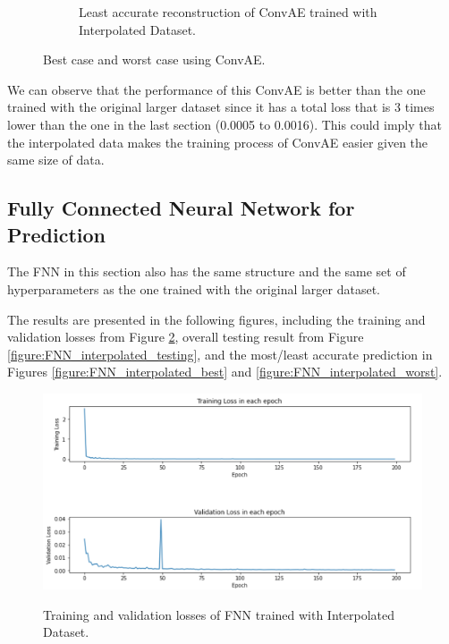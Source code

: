 \begin{figure}[H]
\begin{subfigure}{0.45\textwidth}
    \caption{Least accurate reconstruction of ConvAE trained with Interpolated Dataset.}
\end{subfigure}
\caption{Best case and worst case using ConvAE.}
\label{figure:ConvAE_interpolated_best_worst}
\end{figure}

We can observe that the performance of this ConvAE is better than the one trained with the original larger dataset since it has a total loss that is 3 times lower than the one in the last section (0.0005 to 0.0016). This could imply that the interpolated data makes the training process of ConvAE easier given the same size of data. 


\subsection{Fully Connected Neural Network for Prediction}

The FNN in this section also has the same structure and the same set of hyperparameters as the one trained with the original larger dataset.

The results are presented in the following figures, including the training and validation losses from Figure \ref{figure:FNN_interpolated_losses}, overall testing result from Figure \ref{figure:FNN_interpolated_testing}, and the most/least accurate prediction in Figures \ref{figure:FNN_interpolated_best} and \ref{figure:FNN_interpolated_worst}.

\begin{figure}[H]
    \caption{Training and validation losses of FNN trained with Interpolated Dataset.}
    \includegraphics[scale=0.6]{figures/mantle_convection_images/larger_dataset_interpolated/FNN_trainingData.png}
    \label{figure:FNN_interpolated_losses}
\end{figure}

